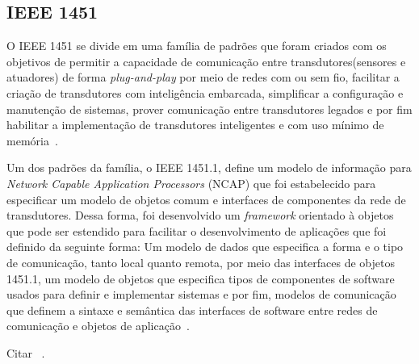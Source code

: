 \subsection{IEEE 1451}
O IEEE 1451 se divide em uma família de padrões que foram criados com os objetivos de permitir a capacidade de comunicação entre transdutores(sensores e atuadores) de forma \emph{plug-and-play} por meio de redes com ou sem fio, facilitar a criação de transdutores com inteligência embarcada, simplificar a configuração e manutenção de sistemas, prover comunicação entre transdutores legados e por fim habilitar a implementação de transdutores inteligentes e com uso mínimo de memória~\cite{ieee1451journal}.

Um dos padrões da família, o IEEE 1451.1, define um modelo de informação para \emph{Network Capable Application Processors} (NCAP) que foi estabelecido para especificar um modelo de objetos comum e interfaces de componentes da rede de transdutores. Dessa forma, foi desenvolvido um \emph{framework} orientado à objetos que pode ser estendido para facilitar o desenvolvimento de aplicações que foi definido da seguinte forma: Um modelo de dados que especifica a forma e o tipo de comunicação, tanto local quanto remota, por meio das interfaces de objetos 1451.1, um modelo de objetos que especifica tipos de componentes de software usados para definir e implementar sistemas e por fim, modelos de comunicação que definem a sintaxe e semântica das interfaces de software entre redes de comunicação e objetos de aplicação~\cite{ieeeOO1451}.

Citar ~\cite{ieee1451standard}.
